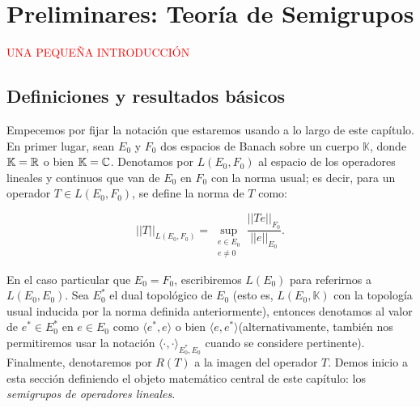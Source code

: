 \chapter{Preliminares: Teoría de Semigrupos}
\label{ch:semigrupos}

\textcolor{red}{UNA PEQUEÑA INTRODUCCIÓN}

\section{Definiciones y resultados básicos}
\label{ch:semigrupos:section:basico}

Empecemos por fijar la notación que estaremos usando a lo largo de este capítulo. En primer lugar, sean $E_0$ y $F_0$ dos espacios de Banach sobre un cuerpo $\mathbb{K}$, donde $\mathbb{K} = \mathbb{R}$ o bien $\mathbb{K} = \mathbb{C}$. Denotamos por $L(E_0, F_0)$ al espacio de los operadores lineales y continuos que van de $E_0$ en $F_0$ con la norma usual; es decir, para un operador $T \in L(E_0, F_0)$, se define la norma de $T$ como:

\[ ||T||_{L(E_0, F_0)} = \sup_{\substack{e \in E_0 \\ e \neq 0}} \frac{||Te||_{F_0}}{||e||_{E_0}}.\]

En el caso particular que $E_0 = F_0$, escribiremos $L(E_0)$ para referirnos a $L(E_0, E_0)$. Sea $E_0^*$ el dual topológico de $E_0$ (esto es, $L(E_0, \mathbb{K})$ con la topología usual inducida por la norma definida anteriormente), entonces denotamos al valor de $e^* \in E_0^*$ en $e \in E_0$ como $\langle e^*, e\rangle$ o bien $\langle e, e^*\rangle$\footnotemark (alternativamente, también nos permitiremos usar la notación $\langle \cdot, \cdot \rangle_{E^*_0, E_0}$ cuando se considere pertinente). Finalmente, denotaremos por $R(T)$ a la imagen del operador $T$.
Demos inicio a esta sección definiendo el objeto matemático central de este capítulo: los \textit{semigrupos de operadores lineales}.\\


